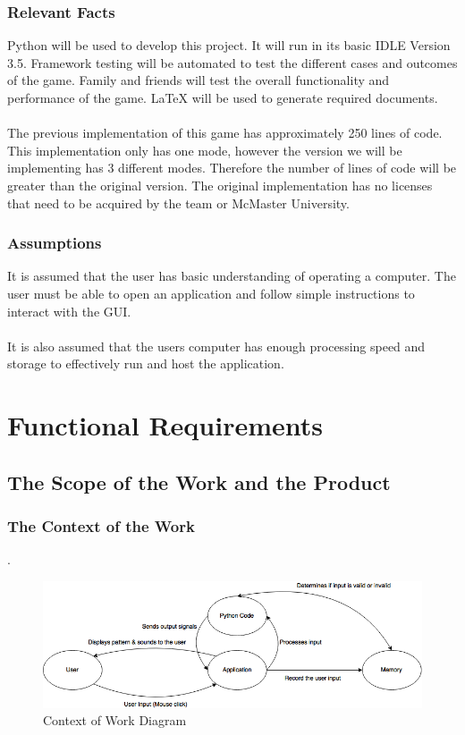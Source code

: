 \documentclass[12pt, titlepage]{article}
\begin{document}
\subsubsection{Relevant Facts}

Python will be used to develop this project. It will run in its basic IDLE Version 3.5. Framework testing will be automated to test the different cases and outcomes of the game. Family and friends will test the overall functionality and performance of the game. LaTeX will be used to generate required documents.\\
\\
The previous implementation of this game has approximately 250 lines of code. This implementation only has one mode, however the version we will be implementing has 3 different modes. Therefore the number of lines of code will be greater than the original version. The original implementation has no licenses that need to be acquired by the team or McMaster University.

\subsubsection{Assumptions}
It is assumed that the user has basic understanding of operating a computer. The user must be able to open an application and follow simple instructions to interact with the GUI.\\
\\
It is also assumed that the users computer has enough processing speed and storage to effectively run and host the application.

\section{Functional Requirements}
\subsection{The Scope of the Work and the Product}

\subsubsection{The Context of the Work}
.
\begin {figure}[h]
	\includegraphics [width = \linewidth] {Context_Of_Work.png}
	\caption {Context of Work Diagram}
	\label {Figure: Context of Work}
\end {figure}
\end{document}
